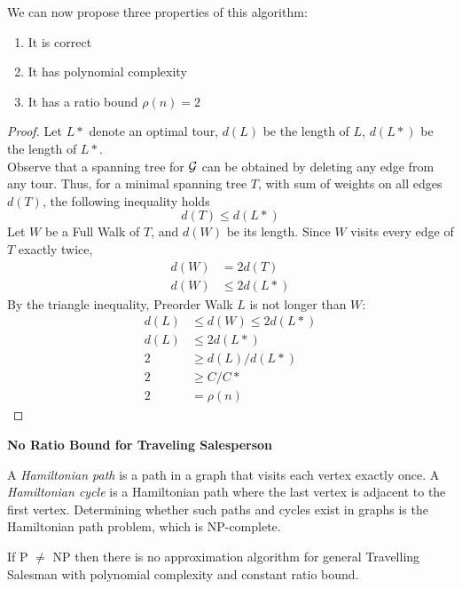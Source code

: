We can now propose three properties of this algorithm:
\begin{enumerate}
    \item It is correct
    \item It has polynomial complexity
    \item It has a ratio bound $\rho(n) = 2$
\end{enumerate}

\begin{proof}
    Let $L*$ denote an optimal tour,
    $d(L)$ be the length of $L$,
    $d(L*)$ be the length of $L*$.\\

    Observe that a spanning tree for $\mathcal{G}$ can be obtained by deleting any edge from any tour.
    Thus, for a minimal spanning tree $T$,
    with sum of weights on all edges $d(T)$,
    the following inequality holds
    $$d(T) \leq d(L*)$$
    Let $W$ be a Full Walk of $T$,
    and $d(W)$ be its length.
    Since $W$ visits every edge of $T$ exactly twice,
    \begin{align*}
        d(W) &= 2d(T) \\
        d(W) &\leq 2d(L*)
    \end{align*}
    By the triangle inequality,
    Preorder Walk $L$ is not longer than $W$:
    \begin{align*}
        d(L) &\leq d(W) \leq 2d(L*)\\
        d(L) &\leq 2d(L*)\\
           2 &\geq d(L)/d(L*) \\
           2 &\geq C/C* \\
           2 &= \rho(n)
    \end{align*}
\end{proof}

\textbf{No Ratio Bound for Traveling Salesperson}
\begin{definition}
    A \textit{Hamiltonian path} is a path in a graph that visits each vertex exactly once.
    A \textit{Hamiltonian cycle} is a Hamiltonian path where the last vertex is adjacent to the first vertex.
    Determining whether such paths and cycles exist in graphs is the Hamiltonian path problem,
    which is NP-complete.
\end{definition}

\begin{theorem}
    If P $\neq$ NP then there is no
    approximation algorithm for general Travelling Salesman with polynomial complexity
    and constant ratio bound.
\end{theorem}

